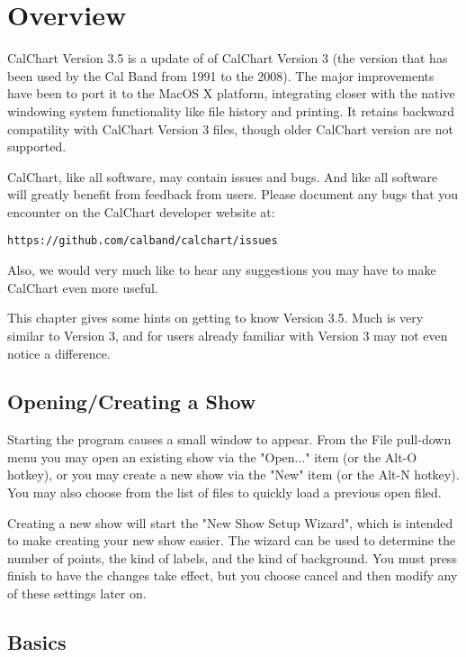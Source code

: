 \chapter{Overview}\label{overview}

CalChart Version 3.5 is a update of of CalChart Version 3 (the version
that has been used by the Cal Band from 1991 to the 2008).  The major
improvements have been to port it to the MacOS X platform, integrating closer
with the native windowing system functionality like file history and printing.
It retains backward compatility with CalChart Version 3 files, though older
CalChart version are not supported.

CalChart, like all software, may contain issues and bugs.  And like all 
software will greatly benefit from feedback from
users.  Please document any bugs that you encounter on the CalChart developer 
website at:

\begin{verbatim}
https://github.com/calband/calchart/issues
\end{verbatim}

Also, we would very much like to hear any suggestions you may have to make
CalChart even more useful.

This chapter gives some hints on getting to know Version 3.5.  Much is
very similar to Version 3, and for users already familiar with Version 3 may 
not even notice a difference.

\section{Opening/Creating a Show}\label{newshow}

Starting the program causes a small window to appear.  From the File pull-down
menu you may open an existing show via the "Open..." item (or the Alt-O hotkey),
or you may create a new show via the "New" item (or the Alt-N hotkey).  You may 
also choose from the list of files to quickly load a previous open filed.

Creating a new show will start the "New Show Setup Wizard", which is intended
to make creating your new show easier.  The wizard can be used to determine the
number of points, the kind of labels, and the kind of background.  You must
press finish to have the changes take effect, but you choose cancel and 
then modify any of these settings later on.

\section{Basics}\label{basics}

